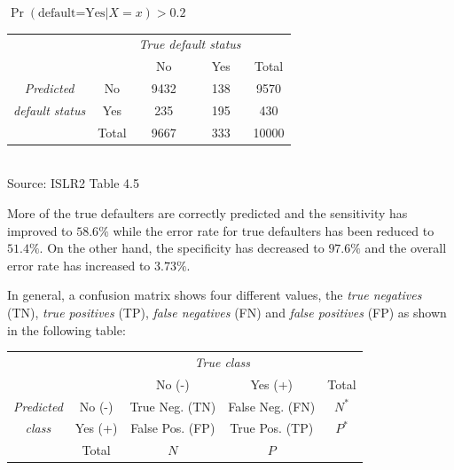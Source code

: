 \begin{center}
\renewcommand{\arraystretch}{1.25}

$\Pr(\text{default=Yes} | X=x) > 0.2$ \\ \vspace{2mm}
\begin{tabular}{cc|cc|c} \hline
     & & \multicolumn{2}{c|}{\emph{True default status}} \\
     & & No & Yes & Total \\ \hline
\emph{Predicted} & No & 9432 & 138 & 9570 \\ 
\emph{default status} & Yes & 235 & 195 & 430 \\ \hline
     & Total & 9667 & 333 & 10000 \\ \hline
\end{tabular} \\
\vspace{\baselineskip}
\scriptsize Source: ISLR2 Table 4.5 \normalsize \\
\end{center}

More of the true defaulters are correctly predicted and the sensitivity has improved to $58.6\%$ while the error rate for true defaulters has been reduced to $51.4\%$. On the other hand, the specificity has decreased to $97.6\%$ and the overall error rate has increased to $3.73\%$. 

In general, a confusion matrix shows four different values, the \emph{true negatives} (TN), \emph{true positives} (TP), \emph{false negatives} (FN) and \emph{false positives} (FP) as shown in the following table:

\begin{center}
\renewcommand{\arraystretch}{1.25}

\begin{tabular}{cc|cc|c} \hline
     & & \multicolumn{2}{c|}{\emph{True class}} \\
     & & No (-) & Yes (+) & Total \\ \hline
\emph{Predicted} & No (-) & True Neg. (TN) & False Neg. (FN) & $N^*$ \\ 
\emph{class} & Yes (+) & False Pos. (FP) & True Pos. (TP) & $P^*$ \\ \hline
     & Total & $N$ & $P$ &  \\ \hline
\end{tabular} \\
\end{center}

